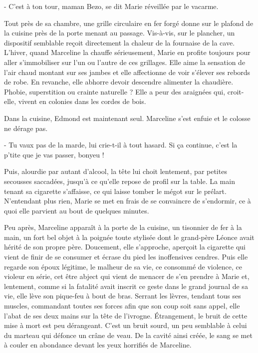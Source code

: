 - C’est à ton tour, maman Bezo, se dit Marie réveillée par le vacarme.

Tout près de sa chambre, une grille circulaire en fer forgé donne sur le plafond de la cuisine près de la porte menant au passage. Vis-à-vis, sur le plancher, un dispositif semblable reçoit directement la chaleur de la fournaise de la cave. L’hiver, quand Marceline la chauffe sérieusement, Marie en profite toujours pour aller s’immobiliser sur l’un ou l’autre de ces grillages. Elle aime la sensation de l’air chaud montant sur ses jambes et elle affectionne de voir s’élever ses rebords de robe. En revanche, elle abhorre devoir descendre alimenter la chaudière. Phobie, superstition ou crainte naturelle ? Elle a peur des araignées qui, croit-elle, vivent en colonies dans les cordes de bois.

Dans la cuisine, Edmond est maintenant seul. Marceline s’est enfuie et le colosse ne dérage pas.

- Tu vaux pas de la marde, lui crie-t-il à tout hasard. Si ça continue, c’est la p’tite que je vas passer, bonyeu !

Puis, alourdie par autant d’alcool, la tête lui choit lentement, par petites secousses saccadées, jusqu’à ce qu’elle repose de profil sur la table. La main tenant sa cigarette s’affaisse, ce qui laisse tomber le mégot sur le prélart. N’entendant plus rien, Marie se met en frais de se convaincre de s’endormir, ce à quoi elle parvient au bout de quelques minutes.

Peu après, Marceline apparaît à la porte de la cuisine, un tisonnier de fer à la main, un fort bel objet à la poignée toute stylisée dont le grand-père Léonce avait hérité de son propre père. Doucement, elle s’approche, aperçoit la cigarette qui vient de finir de se consumer et écrase du pied les inoffensives cendres. Puis elle regarde son époux légitime, le malheur de sa vie, ce consommé de violence, ce violeur en série, cet être abject qui vient de menacer de s’en prendre à Marie et, lentement, comme si la fatalité avait inscrit ce geste dans le grand journal de sa vie, elle lève son pique-feu à bout de bras. Serrant les lèvres, tendant tous ses muscles, commandant toutes ses forces afin que son coup soit sans appel, elle l’abat de ses deux mains sur la tête de l’ivrogne. Étrangement, le bruit de cette mise à mort est peu dérangeant. C’est un bruit sourd, un peu semblable à celui du marteau qui défonce un crâne de veau. De la cavité ainsi créée, le sang se met à couler en abondance devant les yeux horrifiés de Marceline.

